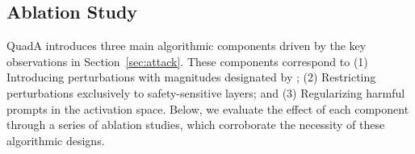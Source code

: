 \subsection{Ablation Study}
\label{sec:ablation_study}
QuadA introduces three main algorithmic components driven by the key observations in Section~\ref{sec:attack}. These components correspond to (1) Introducing perturbations with magnitudes designated by \mva; (2) Restricting perturbations exclusively to safety-sensitive layers; and (3) Regularizing harmful prompts in the activation space. Below, we evaluate the effect of each component through a series of ablation studies, which corroborate the necessity of these algorithmic designs.


